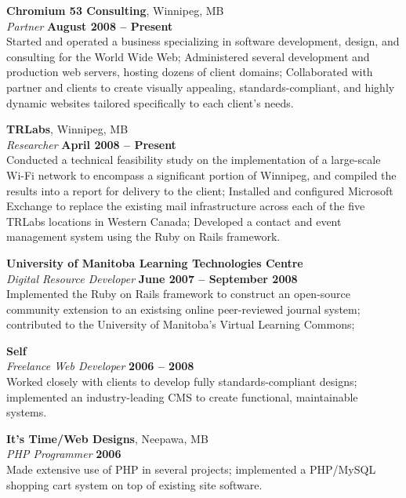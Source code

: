 \documentclass[margin,line,letterpaper]{resume}
\begin{document}
\begin{resume}
  {\bf Chromium 53 Consulting}, Winnipeg, MB \vspace{2mm}\\\vspace{1mm}%
  {\sl Partner} \hfill {\bf August 2008 -- Present}\\
  Started and operated a business specializing in software development, design, and
  consulting for the World Wide Web; Administered several development and production web servers,
  hosting dozens of client domains; Collaborated with partner and clients to create
  visually appealing, standards-compliant, and highly dynamic websites tailored specifically
  to each client's needs.

  {\bf TRLabs}, Winnipeg, MB \vspace{2mm}\\\vspace{1mm}%
  {\sl Researcher} \hfill {\bf April 2008 -- Present}\\
  Conducted a technical feasibility study on the implementation of a large-scale Wi-Fi
  network to encompass a significant portion of Winnipeg, and compiled the results into a report
  for delivery to the client; Installed and configured Microsoft Exchange to replace the
  existing mail infrastructure across each of the five TRLabs locations in Western Canada;
  Developed a contact and event management system using the Ruby on Rails framework.

  {\bf University of Manitoba Learning Technologies Centre} \vspace{2mm}\\\vspace{1mm}%
  {\sl Digital Resource Developer} \hfill {\bf June 2007 -- September 2008}\\
  Implemented the Ruby on Rails framework to construct an open-source
  community extension to an existsing online peer-reviewed journal system; contributed to the
  University of Manitoba's Virtual Learning Commons;

  {\bf Self} \vspace{2mm}\\\vspace{1mm}%
  {\sl Freelance Web Developer} \hfill {\bf 2006 -- 2008}\\
  Worked closely with clients to develop fully standards-compliant designs; implemented
  an industry-leading CMS to create functional, maintainable systems.

  {\bf It's Time/Web Designs}, Neepawa, MB \vspace{2mm}\\\vspace{1mm}%
  {\sl PHP Programmer} \hfill {\bf 2006}\\
  Made extensive use of PHP in several projects; implemented a PHP/MySQL shopping cart
  system on top of existing site software.


\end{resume}
\end{document}
